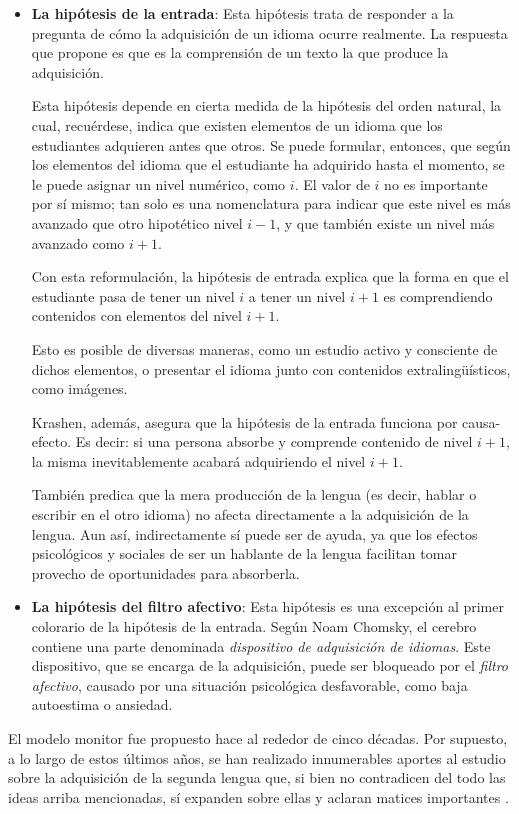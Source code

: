 \begin{itemize}
	\item \textbf{La hipótesis de la entrada}: Esta hipótesis trata de responder a la pregunta de cómo la adquisición de un idioma ocurre realmente. La respuesta que propone es que es la comprensión de un texto la que produce la adquisición.
	
	Esta hipótesis depende en cierta medida de la hipótesis del orden natural, la cual, recuérdese, indica que existen elementos de un idioma que los estudiantes adquieren antes que otros. Se puede formular, entonces, que según los elementos del idioma que el estudiante ha adquirido hasta el momento, se le puede asignar un nivel numérico, como $i$. El valor de $i$ no es importante por sí mismo; tan solo es una nomenclatura para indicar que este nivel es más avanzado que otro hipotético nivel $i - 1$, y que también existe un nivel más avanzado como $i + 1$.
	
	Con esta reformulación, la hipótesis de entrada explica que la forma en que el estudiante pasa de tener un nivel $i$ a tener un nivel $i + 1$ es comprendiendo contenidos con elementos del nivel $i + 1$.
	
	Esto es posible de diversas maneras, como un estudio activo y consciente de dichos elementos, o presentar el idioma junto con contenidos extralingüísticos, como imágenes.
	
	Krashen, además, asegura que la hipótesis de la entrada funciona por causa-efecto. Es decir: si una persona absorbe y comprende contenido de nivel $i + 1$, la misma inevitablemente acabará adquiriendo el nivel $i + 1$.
	
	También predica que la mera producción de la lengua (es decir, hablar o escribir en el otro idioma) no afecta directamente a la adquisición de la lengua. Aun así, indirectamente sí puede ser de ayuda, ya que los efectos psicológicos y sociales de ser un hablante de la lengua facilitan tomar provecho de oportunidades para absorberla.
	
	\item \textbf{La hipótesis del filtro afectivo}: Esta hipótesis es una excepción al primer colorario de la hipótesis de la entrada. Según Noam Chomsky, el cerebro contiene una parte denominada \textit{dispositivo de adquisición de idiomas}. Este dispositivo, que se encarga de la adquisición, puede ser bloqueado por el \textit{filtro afectivo}, causado por una situación psicológica desfavorable, como baja autoestima o ansiedad.
\end{itemize}

El modelo monitor fue propuesto hace al rededor de cinco décadas. Por supuesto, a lo largo de estos últimos años, se han realizado innumerables aportes al estudio sobre la adquisición de la segunda lengua que, si bien no contradicen del todo las ideas arriba mencionadas, sí expanden sobre ellas y aclaran matices importantes \autocite{https://doi.org/10.1111/flan.12552}. \todo[¿Cuáles?]

